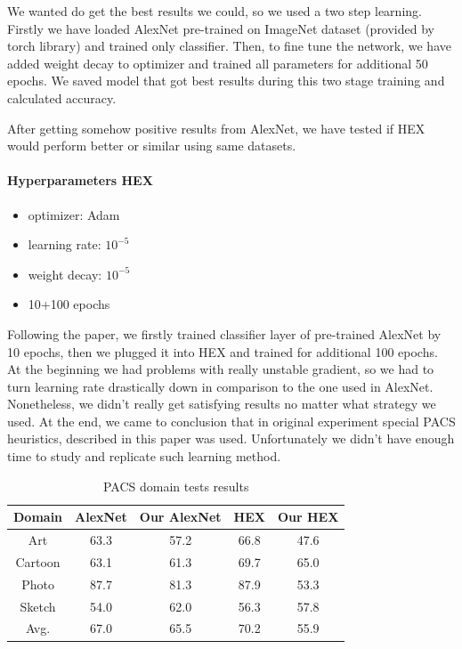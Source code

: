 \documentclass{article} %
\begin{document}
We wanted do get the best results we could, so we used a two step learning. Firstly we have loaded AlexNet pre-trained
on ImageNet dataset (provided by torch library) and trained only classifier. Then, to fine tune the network, we have added
weight decay to optimizer and trained all parameters for additional 50 epochs. We saved model that got best results during
this two stage training and calculated accuracy. 

After getting somehow positive results from AlexNet, we have tested if HEX would perform better or similar using same datasets.

\paragraph{Hyperparameters HEX} 
\begin{itemize}[noitemsep]
    \item optimizer: Adam
    \item learning rate: $10^{-5}$
    \item weight decay: $10^{-5}$
    \item 10+100 epochs
\end{itemize}

Following the paper, we firstly trained classifier layer of pre-trained AlexNet by 10 epochs, then we plugged it into HEX and trained for
additional 100 epochs. At the beginning we had problems with really unstable gradient, so we had to turn learning rate drastically down in 
comparison to the one used in AlexNet. Nonetheless, we didn't really get satisfying results no matter what strategy
we used. At the end, we came to conclusion that in original experiment special PACS heuristics, described in this paper \citep{Li2017dg} was used.
Unfortunately we didn't have enough time to study and replicate such learning method.

\begin{table}[H]
    \caption{PACS domain tests results}
    \centering
    \begin{tabular}{ccccc}
        \hline
        Domain & AlexNet \citep{wang2018learning} & Our AlexNet & HEX \citep{wang2018learning} & Our HEX \\
        \hline
        Art     & 63.3 & 57.2 & 66.8 & 47.6 \\
        Cartoon & 63.1 & 61.3 & 69.7 & 65.0 \\
        Photo   & 87.7 & 81.3 & 87.9 & 53.3 \\
        Sketch  & 54.0 & 62.0 & 56.3 & 57.8 \\
        \hline
        Avg.     & 67.0 & 65.5 & 70.2 & 55.9 \\
        \hline
    \end{tabular}
\end{table}
\end{document}
